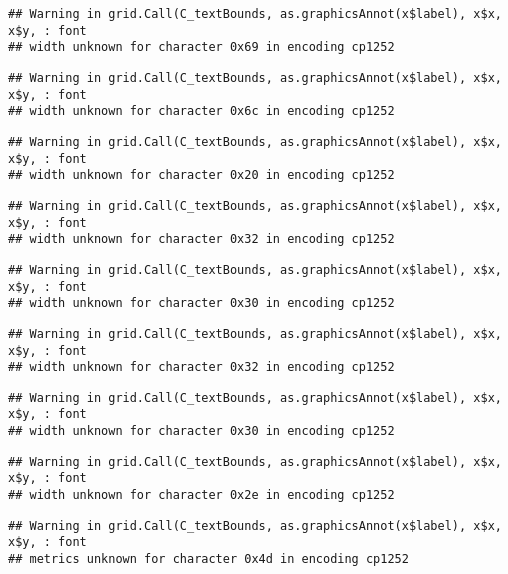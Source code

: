 \documentclass[
]{article}
\begin{document}
\begin{verbatim}
## Warning in grid.Call(C_textBounds, as.graphicsAnnot(x$label), x$x, x$y, : font
## width unknown for character 0x69 in encoding cp1252
\end{verbatim}

\begin{verbatim}
## Warning in grid.Call(C_textBounds, as.graphicsAnnot(x$label), x$x, x$y, : font
## width unknown for character 0x6c in encoding cp1252
\end{verbatim}

\begin{verbatim}
## Warning in grid.Call(C_textBounds, as.graphicsAnnot(x$label), x$x, x$y, : font
## width unknown for character 0x20 in encoding cp1252
\end{verbatim}

\begin{verbatim}
## Warning in grid.Call(C_textBounds, as.graphicsAnnot(x$label), x$x, x$y, : font
## width unknown for character 0x32 in encoding cp1252
\end{verbatim}

\begin{verbatim}
## Warning in grid.Call(C_textBounds, as.graphicsAnnot(x$label), x$x, x$y, : font
## width unknown for character 0x30 in encoding cp1252
\end{verbatim}

\begin{verbatim}
## Warning in grid.Call(C_textBounds, as.graphicsAnnot(x$label), x$x, x$y, : font
## width unknown for character 0x32 in encoding cp1252
\end{verbatim}

\begin{verbatim}
## Warning in grid.Call(C_textBounds, as.graphicsAnnot(x$label), x$x, x$y, : font
## width unknown for character 0x30 in encoding cp1252
\end{verbatim}

\begin{verbatim}
## Warning in grid.Call(C_textBounds, as.graphicsAnnot(x$label), x$x, x$y, : font
## width unknown for character 0x2e in encoding cp1252
\end{verbatim}

\begin{verbatim}
## Warning in grid.Call(C_textBounds, as.graphicsAnnot(x$label), x$x, x$y, : font
## metrics unknown for character 0x4d in encoding cp1252
\end{verbatim}
\end{document}
